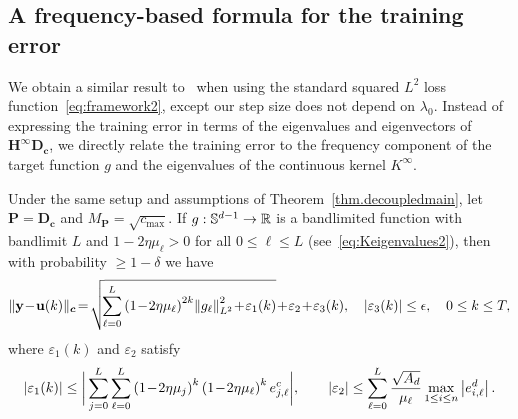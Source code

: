 \documentclass{article} %
\begin{document}
\subsection{A frequency-based formula for the training error}
We obtain a similar result to~\cite[Thm.~4.1]{arora} when using the standard squared $L^2$ loss function~\cref{eq:framework2}, except our step size does not depend on $\lambda_0$. Instead of expressing the training error in terms of the eigenvalues and eigenvectors of ${\mathbf{H}}^\infty \mathbf{D}_{\boldsymbol{c}}$, we directly relate the training error to the frequency component of the target function $g$ and the eigenvalues of the continuous kernel $K^\infty$.

\begin{thm}\label{thm.freqbias}
Under the same setup and assumptions of Theorem~\ref{thm.decoupledmain}, let $\mathbf{P} = \mathbf{D}_{\boldsymbol{c}}$ and $M_{\mathbf{P}} = \sqrt{c_{\text{max}}}$. If $g:{\mathbb{S}}^{d-1}\rightarrow\mathbb{R}$ is a bandlimited function with bandlimit $L$ and $1 - 2\eta\mu_\ell > 0$ for all $0 \leq \ell \leq L$ (see~\cref{eq:Keigenvalues2}), then with probability $\geq 1-\delta$ we have
\begin{equation}\label{eq.L2freqbias}
    \| \mathbf{y} \!-\! \mathbf{u}(k) \|_{\boldsymbol{c}} \!=\! \sqrt{\!\sum_{\ell=0}^L \left(1\!-\!2\eta\mu_\ell\right)^{2k} \!\norm{g_\ell}^2_{L^2} \!+\! \varepsilon_1(k)} \!+\! \varepsilon_2 \!+\! \varepsilon_3(k), \quad \abs{\varepsilon_3(k)} \leq \epsilon,\quad 0\leq k\leq T,
\end{equation}
where $\varepsilon_1(k)$ and $\varepsilon_2$ satisfy
\begin{align*}
    \left|\varepsilon_1(k)\right| \leq \bigg|\sum_{j=0}^L \sum_{\ell=0}^L \left(1\!-\!2\eta\mu_j\right)^k \left(1\!-\!2\eta\mu_\ell\right)^k e^c_{j,\ell}\bigg|, \qquad \left|\varepsilon_2\right| \leq \sum_{\ell=0}^L \frac{\sqrt{A_d}}{\mu_\ell} \max_{1 \leq i \leq n} \left|e^d_{i,\ell}\right|.
\end{align*}
\end{thm}
\end{document}
